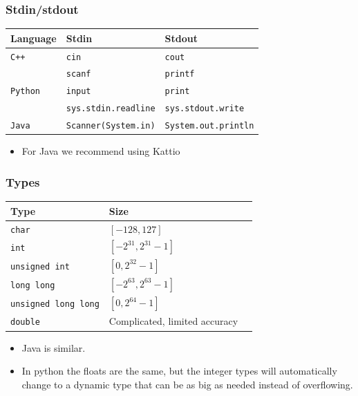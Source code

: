 \documentclass{beamer}
\begin{document}
\begin{frame}[plain]
	\frametitle{Stdin/stdout}
	\begin{center}
		\begin{tabular}{|l|l|l|}
            	\hline 
            Language & Stdin  & Stdout \\
            \hline
            \texttt{C++} & \texttt{cin} & \texttt{cout} \\
            & \texttt{scanf} & \texttt{printf} \\
          	\hline
            \texttt{Python} & \texttt{input} & \texttt{print} \\
            & \texttt{sys.stdin.readline} & \texttt{sys.stdout.write} \\
            \hline
            \texttt{Java} & \texttt{Scanner(System.in)} & \texttt{System.out.println} \\
            \hline
        \end{tabular}
        \vspace*{0.5cm}
        \begin{itemize}
        		\item For Java we recommend using Kattio
        \end{itemize}
    \end{center}
\end{frame}

\begin{frame}[plain]
	\frametitle{Types}
	\begin{center}
		\begin{tabular}{|l|l|l|}
            	\hline 
            Type & Size \\
            \hline
            	\texttt{char} & $[-128, 127]$ \\
            	\texttt{int} & $[-2^{31}, 2^{31} - 1]$ \\
			\texttt{unsigned int} & $[0, 2^{32} - 1]$ \\
			\texttt{long long} & $[-2^{63}, 2^{63} - 1]$ \\
			\texttt{unsigned long long} & $[0, 2^{64} - 1]$ \\
			\texttt{double} & Complicated, limited accuracy \\
			\hline
        \end{tabular}
        \vspace*{0.5cm}
        \begin{itemize}
        		\item Java is similar.
        		\item In python the floats are the same, but the integer types will automatically change to a dynamic type that can be as big as needed instead of overflowing.
        \end{itemize}
    \end{center}
\end{frame}
\end{document}
